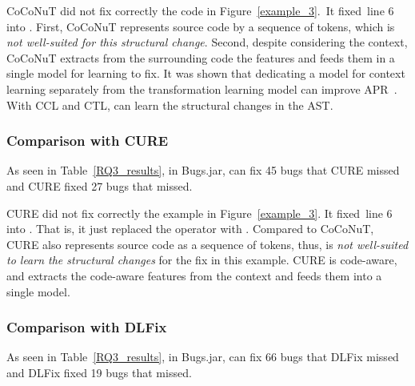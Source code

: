CoCoNuT did not fix correctly the code in Figure~\ref{example_3}.~It
fixed~line 6 into   
 \code{());}. First, CoCoNuT represents source code by
a sequence of tokens, which is {\em not well-suited for this
  structural change}. Second, despite considering the context, CoCoNuT
extracts from the surrounding code the features and feeds them in a
single model for learning to fix.
%
It was shown that dedicating a model for context learning separately
from the transformation learning model can improve APR~\cite{icse20}.
With CCL and CTL, {\tool} can learn the structural changes in the AST.

\subsubsection{\bf Comparison with CURE}

As seen in Table~\ref{RQ3_results}, in Bugs.jar, {\tool} can fix 45
bugs that CURE missed and CURE fixed 27 bugs that {\tool} missed.

CURE did not fix correctly the example in Figure~\ref{example_3}. It
fixed~line 6 into 
  \code{/} .
That is, it just replaced the operator \code{\%} with \code{/}.
Compared to CoCoNuT, CURE also represents source code as a sequence of
tokens, thus, is {\em not well-suited to learn the structural changes} for
the fix in this example. CURE is code-aware,
and extracts the code-aware features from the context and feeds them
into a single model.

\subsubsection{\bf Comparison with DLFix}

As seen in Table~\ref{RQ3_results}, in Bugs.jar, {\tool} can fix 66
bugs that DLFix missed and DLFix fixed 19 bugs that {\tool}
missed.

